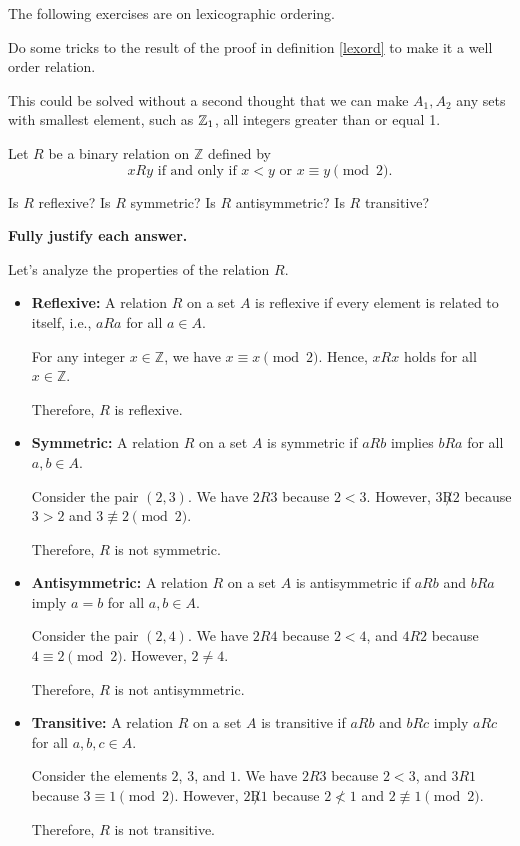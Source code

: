 The following exercises are on lexicographic ordering.
\begin{exercise}
	Do some tricks to the result of the proof in definition \ref{lexord} to make it a well order relation.
\end{exercise}
\begin{solution}
	This could be solved without a second thought that we can make $A_1,A_2$ any sets with smallest element, such as $\mathbb{Z}_{1}$, all integers greater than or equal 1.
\end{solution}
\begin{exercise}
Let $R$ be a binary relation on $\mathbb{Z}$ defined by 
\[
xRy \text{ if and only if } x < y \text{ or } x \equiv y \pmod{2}.
\]

Is $R$ reflexive? Is $R$ symmetric? Is $R$ antisymmetric? Is $R$ transitive?

\textbf{Fully justify each answer.}
\end{exercise}
\begin{solution}
Let's analyze the properties of the relation $R$.

\begin{itemize}
    \item \textbf{Reflexive:} A relation $R$ on a set $A$ is reflexive if every element is related to itself, i.e., $aRa$ for all $a \in A$. 

    For any integer $x \in \mathbb{Z}$, we have $x \equiv x \pmod{2}$. Hence, $xRx$ holds for all $x \in \mathbb{Z}$. 

    Therefore, $R$ is reflexive.

    \item \textbf{Symmetric:} A relation $R$ on a set $A$ is symmetric if $aRb$ implies $bRa$ for all $a, b \in A$.

    Consider the pair $(2, 3)$. We have $2R3$ because $2 < 3$. However, $3 \not R 2$ because $3 > 2$ and $3 \not\equiv 2 \pmod{2}$. 

    Therefore, $R$ is not symmetric.

    \item \textbf{Antisymmetric:} A relation $R$ on a set $A$ is antisymmetric if $aRb$ and $bRa$ imply $a = b$ for all $a, b \in A$.

    Consider the pair $(2, 4)$. We have $2R4$ because $2 < 4$, and $4R2$ because $4 \equiv 2 \pmod{2}$. However, $2 \neq 4$.

    Therefore, $R$ is not antisymmetric.

    \item \textbf{Transitive:} A relation $R$ on a set $A$ is transitive if $aRb$ and $bRc$ imply $aRc$ for all $a, b, c \in A$.

    Consider the elements $2$, $3$, and $1$. We have $2R3$ because $2 < 3$, and $3R1$ because $3 \equiv 1 \pmod{2}$. However, $2 \not R 1$ because $2 \not< 1$ and $2 \not\equiv 1 \pmod{2}$. 

    Therefore, $R$ is not transitive.
\end{itemize}


\end{solution}
